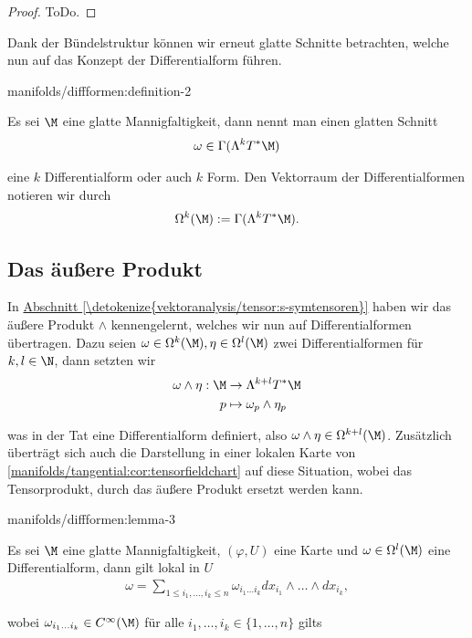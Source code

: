 \documentclass[letterpaper,10pt,german]{jupyterBook}
\begin{document}
\begin{proof}
 ToDo.
\end{proof}

\par
Dank der Bündelstruktur können wir erneut glatte Schnitte betrachten, welche nun auf das Konzept der Differentialform führen.
\begin{definition}{}{manifolds/diffformen:definition-2}



\par
Es sei \(\M\) eine glatte Mannigfaltigkeit, dann nennt man einen glatten Schnitt
\begin{align*}
\omega\in \Gamma(\Lambda^k T^\ast\M)
\end{align*}
\par
eine \(k\) Differentialform oder auch \(k\) Form. Den Vektorraum der Differentialformen notieren wir durch
\begin{align*}
\Omega^k(\M) := \Gamma(\Lambda^k T^\ast\M).
\end{align*}\end{definition}


\subsection{Das äußere Produkt}
\label{\detokenize{manifolds/diffformen:das-auszere-produkt}}
\par
In \hyperref[\detokenize{vektoranalysis/tensor:s-symtensoren}]{Abschnitt \ref{\detokenize{vektoranalysis/tensor:s-symtensoren}}} haben wir das äußere Produkt \(\wedge\) kennengelernt, welches wir nun auf Differentialformen übertragen. Dazu seien \(\omega\in \Omega^k(\M), \eta\in \Omega^l(\M)\) zwei Differentialformen für \(k,l\in\N\), dann setzten wir
\begin{align*}
\omega \wedge \eta:\M &\to \Lambda^{k+l}T^\ast\M\\
p&\mapsto \omega_p \wedge \eta_p
\end{align*}
\par
was in der Tat eine Differentialform definiert, also \(\omega\wedge\eta \in \Omega^{k+l}(\M)\). Zusätzlich überträgt sich auch die Darstellung in einer lokalen Karte von \cref{manifolds/tangential:cor:tensorfieldchart} auf diese Situation, wobei das Tensorprodukt, durch das äußere Produkt ersetzt werden kann.
\begin{lemma}{}{manifolds/diffformen:lemma-3}



\par
Es sei \(\M\) eine glatte Mannigfaltigkeit, \((\varphi,U)\) eine Karte und \(\omega\in\Omega^l(\M)\) eine Differentialform, dann gilt lokal in \(U\)
\begin{align*}
\omega = \sum_{1\leq i_1,\ldots,i_k \leq n}\omega_{i_1\ldots i_k}
dx_{i_1}\wedge\ldots\wedge dx_{i_k},
\end{align*}
\par
wobei \(\omega_{i_1\ldots i_k}\in C^\infty(\M)\) für alle \(i_1,\ldots,i_k\in\{1,\ldots,n\}\) gilts
\end{lemma}
\end{document}
